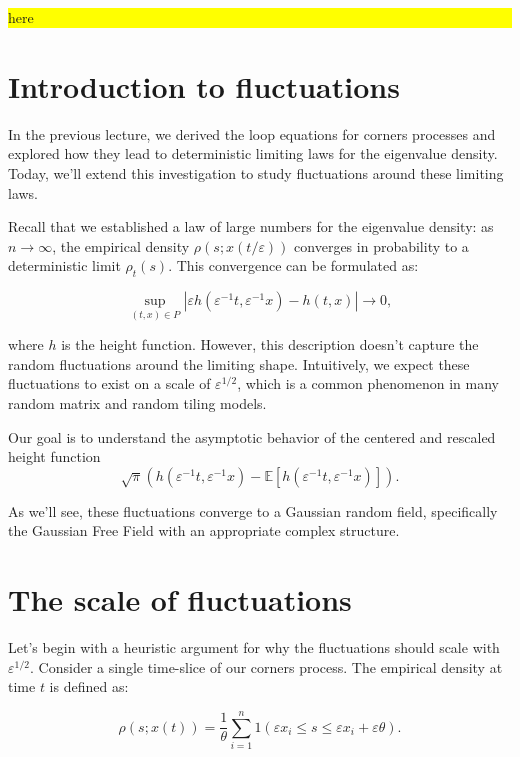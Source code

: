 \documentclass[letterpaper,11pt,oneside,reqno]{article}
\numberwithin{equation}{section}
\theoremstyle{definition}
\begin{document}
\colorbox{yellow}{\parbox{.7\textwidth}{here}}















\section{Introduction to fluctuations}

In the previous lecture, we derived the loop equations for corners processes and explored how they lead to deterministic limiting laws for the eigenvalue density. Today, we'll extend this investigation to study fluctuations around these limiting laws.

Recall that we established a law of large numbers for the eigenvalue density: as $n \to \infty$, the empirical density $\rho(s; x(t/\varepsilon))$ converges in probability to a deterministic limit $\rho_t(s)$. This convergence can be formulated as:

$$\sup_{(t,x) \in P} |\varepsilon h(\varepsilon^{-1}t, \varepsilon^{-1}x) - h(t,x)| \to 0,$$

where $h$ is the height function. However, this description doesn't capture the random fluctuations around the limiting shape. Intuitively, we expect these fluctuations to exist on a scale of $\varepsilon^{1/2}$, which is a common phenomenon in many random matrix and random tiling models.

Our goal is to understand the asymptotic behavior of the centered and rescaled height function
$$\sqrt{\pi}(h(\varepsilon^{-1}t, \varepsilon^{-1}x) - \mathbb{E}[h(\varepsilon^{-1}t, \varepsilon^{-1}x)]).$$

As we'll see, these fluctuations converge to a Gaussian random field, specifically the Gaussian Free Field with an appropriate complex structure.

\section{The scale of fluctuations}

Let's begin with a heuristic argument for why the fluctuations should scale with $\varepsilon^{1/2}$. Consider a single time-slice of our corners process. The empirical density at time $t$ is defined as:

$$\rho(s; x(t)) = \frac{1}{\theta}\sum_{i=1}^n 1(\varepsilon x_i \leq s \leq \varepsilon x_i + \varepsilon\theta).$$
\end{document}
